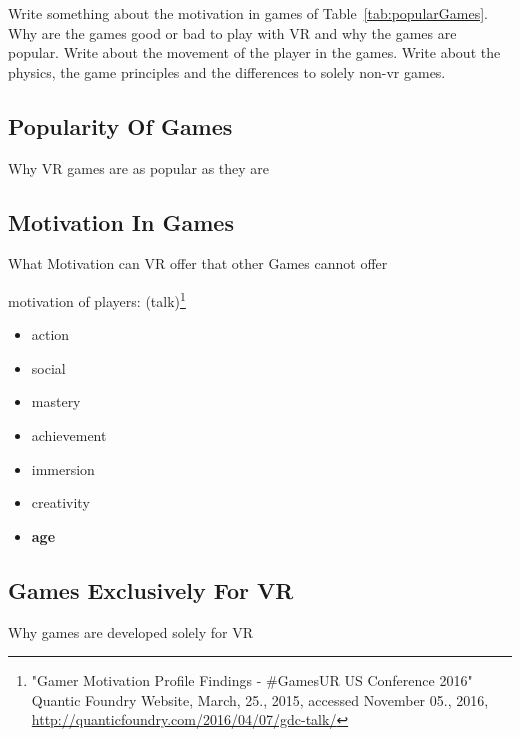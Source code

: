 Write something about the motivation in games of Table~\ref{tab:popularGames}. Why are the games good or bad to play with VR and why the games are popular. Write about the movement of the player in the games. Write about the physics, the game principles and the differences to solely non-vr games.

\subsection{Popularity Of Games}
Why VR games are as popular as they are

\subsection{Motivation In Games}
What Motivation can VR offer that other Games cannot offer


motivation of players: (talk)\footnote{"Gamer Motivation Profile Findings - \#GamesUR US Conference 2016" Quantic Foundry Website, March, 25., 2015, accessed November 05., 2016, \url{http://quanticfoundry.com/2016/04/07/gdc-talk/}}
\begin{itemize}
	\item action
	\item social
	\item mastery
	\item achievement
	\item immersion
	\item creativity
	\item \textbf{age}
\end{itemize}

\subsection{Games Exclusively For VR}
Why games are developed solely for VR
